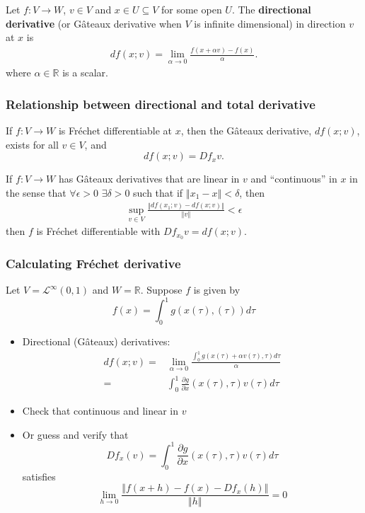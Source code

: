 \documentclass[compress]{beamer}
\def\R{\mathbb{R}}
\newcommand{\norm}[1]{\left\Vert {#1} \right\Vert}
\renewcommand{\to}{{\rightarrow}}
\begin{document}
\begin{frame}
  \begin{definition}
    Let $f: V \to W$, $v \in V$ and $x \in U \subseteq V$ for some open
    $U$. The \textbf{directional derivative} (or G\^{a}teaux derivative
    when $V$ is infinite dimensional)  in direction $v$ at $x$ is
    \begin{align*}
      df(x;v) = \lim_{\alpha \to 0} \frac{f(x + \alpha v) - f(x)}{\alpha}.
    \end{align*}  
    where $\alpha \in \R$ is a scalar.
  \end{definition}
\end{frame}

\begin{frame}\frametitle{Relationship between directional and total derivative}
  \begin{lemma}\label{lem:fregat}
    If $f: V \to W$ is Fr\'{e}chet differentiable at $x$, then the
    G\^{a}teaux derivative, $df(x;v)$, exists for all $v \in V$, and
    \[ df(x;v) = Df_x v. \]
  \end{lemma}

  \begin{lemma}\label{lem:gatfre}
    If $f: V \to W$ has G\^{a}teaux derivatives that are linear in $v$
    and ``continuous'' in $x$ in the sense that $\forall \epsilon>0$
    $\exists \delta > 0$ such that if $\norm{x_1 - x} < \delta$, then
    \begin{align*}
      \sup_{v \in V} \frac{\norm{df(x_1;v) - df(x;v)}}{\norm{v}} < \epsilon
    \end{align*}
    then $f$ is Fr\'{e}chet differentiable with $Df_{x_0} v = df(x;v)$.
  \end{lemma}
\end{frame}

\begin{frame}[shrink]
  \frametitle{Calculating Fr\'{e}chet derivative}
  \begin{example}
    Let $V = \mathcal{L}^\infty(0,1)$ and $W = \R$. Suppose $f$ is
    given by 
    \[ f(x) = \int_0^1 g(x(\tau),(\tau)) d\tau \] 
    \begin{itemize}
    \item Directional (G\^{a}teaux) derivatives:
      \begin{align*}
        df(x;v) = & \lim_{\alpha \to 0} \frac{\int_0^1 g(x(\tau) + \alpha
          v(\tau), \tau) d\tau}{\alpha} \\
        = & \int_0^1 \frac{\partial g}{\partial x}(x(\tau),\tau) v(\tau)
        d\tau
      \end{align*}    
    \item Check that continuous and linear in $v$
    \item Or guess and verify that
      \[ Df_x(v) = \int_0^1 \frac{\partial g}{\partial x}(x(\tau),\tau)
      v(\tau) d\tau \]
      satisfies
      \[ \lim_{h \to 0} \frac{\norm{f(x+h) - f(x) - Df_x(h)
        }}{\norm{h}} =  0 \]
    \end{itemize}      
  \end{example}  
\end{frame}
\end{document}
